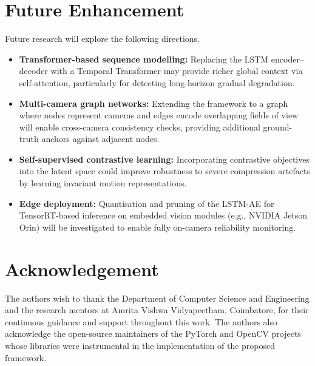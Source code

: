 \documentclass[conference]{IEEEtran}
\begin{document}
\section{Future Enhancement}
Future research will explore the following directions.
\begin{itemize}
    \item \textbf{Transformer-based sequence modelling:} Replacing the
          LSTM encoder--decoder with a Temporal Transformer may provide
          richer global context via self-attention, particularly for
          detecting long-horizon gradual degradation.
    \item \textbf{Multi-camera graph networks:} Extending the framework
          to a graph where nodes represent cameras and edges encode
          overlapping fields of view will enable cross-camera consistency
          checks, providing additional ground-truth anchors against
          adjacent nodes.
    \item \textbf{Self-supervised contrastive learning:} Incorporating
          contrastive objectives into the latent space could improve
          robustness to severe compression artefacts by learning invariant
          motion representations.
    \item \textbf{Edge deployment:} Quantisation and pruning of the
          LSTM-AE for TensorRT-based inference on embedded vision modules
          (e.g., NVIDIA Jetson Orin) will be investigated to enable
          fully on-camera reliability monitoring.
\end{itemize}

\section*{Acknowledgement}
The authors wish to thank the Department of Computer Science and
Engineering and the research mentors at Amrita Vishwa Vidyapeetham,
Coimbatore, for their continuous guidance and support throughout this
work.  The authors also acknowledge the open-source maintainers of the
PyTorch and OpenCV projects whose libraries were instrumental in the
implementation of the proposed framework.
\end{document}
